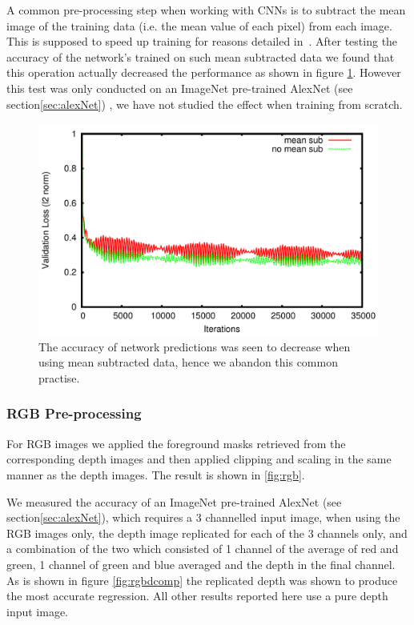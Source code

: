 \documentclass[11pt]{article} %
\begin{document}
A common pre-processing step when working with CNNs is to subtract the mean image of the training data (i.e. the mean value of each pixel) from each image. This is supposed to speed up training for reasons detailed in~\cite{LeCun1998a,Bottou2010,LeCun2012}. After testing the accuracy of the network's trained on such mean subtracted data we found that this operation actually decreased the performance as shown in figure \ref{fig:meanSubComp}. However this test was only conducted on an ImageNet pre-trained AlexNet (see section\ref{sec:alexNet}) , we have not studied the effect when training from scratch.

\begin{figure}
\includegraphics*[width=0.9\linewidth,clip]{meanSub.pdf} %
\caption{The accuracy of network predictions was seen to decrease when using mean subtracted data, hence we abandon this common practise.}
\label{fig:meanSubComp}
\end{figure}


\subsubsection{RGB Pre-processing}

For RGB images we applied the foreground masks retrieved from the corresponding depth images and then applied clipping and scaling in the same manner as the depth images. The result is shown in \ref{fig:rgb}. 

We measured the accuracy of an ImageNet pre-trained AlexNet (see section\ref{sec:alexNet}), which requires a 3 channelled input image, when using the RGB images only, the depth image replicated for each of the 3 channels only, and a combination of the two which consisted of 1 channel of the average of red and green, 1 channel of green and blue averaged and the depth in the final channel. As is shown in figure \ref{fig:rgbdcomp} the replicated depth was shown to produce the most accurate regression. All other results reported here use a pure depth input image. 
\end{document}
